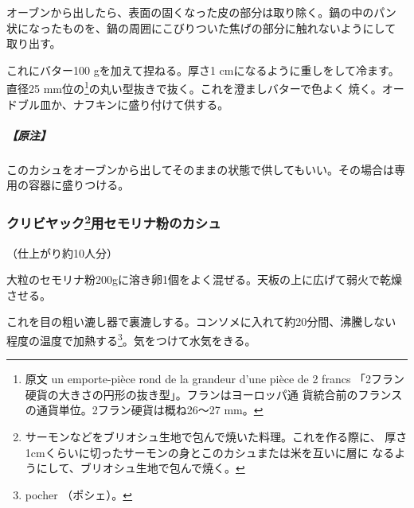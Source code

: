 \begin{recette}
オーブンから出したら、表面の固くなった皮の部分は取り除く。鍋の中のパン
状になったものを、鍋の周囲にこびりついた焦げの部分に触れないようにして
取り出す。

これにバター100 gを加えて捏ねる。厚さ1 cmになるように重しをして冷ます。
直径25 mm位の\footnote{原文 un emporte-pièce rond de la grandeur d'une
  pièce de 2 francs
  「2フラン硬貨の大きさの円形の抜き型」。フランはヨーロッパ通
  貨統合前のフランスの通貨単位。2フラン硬貨は概ね26〜27 mm。}の丸い型抜きで抜く。これを澄ましバターで色よく
焼く。オードブル皿か、ナフキンに盛り付けて供する。

\hypertarget{ux539fux6ce8}{%
\subparagraph{【原注】}\label{ux539fux6ce8}}

このカシュをオーブンから出してそのままの状態で供してもいい。その場合は専用の容器に盛りつける。

\maeaki

\hypertarget{kache-de-semoule-pour-coulibiac}{%
\subsubsection[クリビヤック用セモリナ粉のカシュ]{\texorpdfstring{クリビヤック\footnote{サーモンなどをブリオシュ生地で包んで焼いた料理。これを作る際に、
  厚さ1cmくらいに切ったサーモンの身とこのカシュまたは米を互いに層に
  なるようにして、ブリオシュ生地で包んで焼く。}用セモリナ粉のカシュ}{クリビヤック用セモリナ粉のカシュ}}\label{kache-de-semoule-pour-coulibiac}}



（仕上がり約10人分）

大粒のセモリナ粉200gに溶き卵1個をよく混ぜる。天板の上に広げて弱火で乾燥させる。

これを目の粗い漉し器で裏漉しする。コンソメに入れて約20分間、沸騰しない
程度の温度で加熱する\footnote{pocher （ポシェ）。}。気をつけて水気をきる。


\end{recette}
